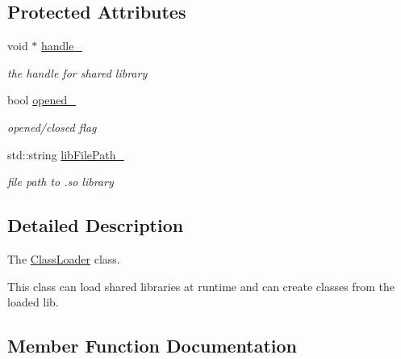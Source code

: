 \subsection*{Protected Attributes}
\begin{DoxyCompactItemize}
\item 
void $\ast$ \hyperlink{classow__plugin__loader_1_1ClassLoader_a85a929ab2f12298ff72b791ce816f899}{handle\+\_\+}\hypertarget{classow__plugin__loader_1_1ClassLoader_a85a929ab2f12298ff72b791ce816f899}{}\label{classow__plugin__loader_1_1ClassLoader_a85a929ab2f12298ff72b791ce816f899}

\begin{DoxyCompactList}\small\item\em the handle for shared library \end{DoxyCompactList}\item 
bool \hyperlink{classow__plugin__loader_1_1ClassLoader_aa9db3390561bd553d028577cbbcc29e3}{opened\+\_\+}\hypertarget{classow__plugin__loader_1_1ClassLoader_aa9db3390561bd553d028577cbbcc29e3}{}\label{classow__plugin__loader_1_1ClassLoader_aa9db3390561bd553d028577cbbcc29e3}

\begin{DoxyCompactList}\small\item\em opened/closed flag \end{DoxyCompactList}\item 
std\+::string \hyperlink{classow__plugin__loader_1_1ClassLoader_afcb3228923170420f9faf9ef44addd56}{lib\+File\+Path\+\_\+}\hypertarget{classow__plugin__loader_1_1ClassLoader_afcb3228923170420f9faf9ef44addd56}{}\label{classow__plugin__loader_1_1ClassLoader_afcb3228923170420f9faf9ef44addd56}

\begin{DoxyCompactList}\small\item\em file path to .so library \end{DoxyCompactList}\end{DoxyCompactItemize}


\subsection{Detailed Description}
The \hyperlink{classow__plugin__loader_1_1ClassLoader}{Class\+Loader} class. 

This class can load shared libraries at runtime and can create classes from the loaded lib. 

\subsection{Member Function Documentation}
